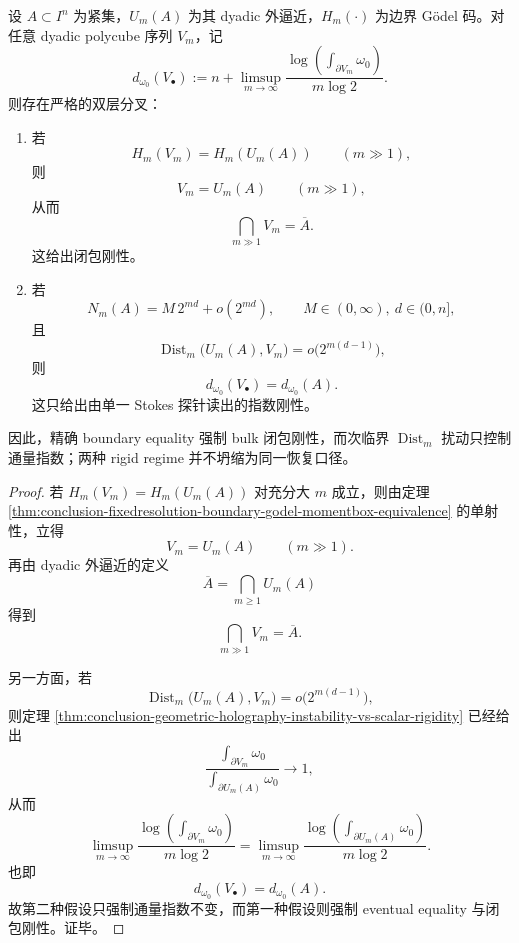 \begin{theorem}\label{thm:conclusion-boundary-godel-holography-closure-vs-exponent-bifurcation}
设 \(A\subset I^n\) 为紧集，\(U_m(A)\) 为其 dyadic 外逼近，\(H_m(\cdot)\) 为边界 Gödel 码。对任意 dyadic polycube 序列 \(V_m\)，记
\[
d_{\omega_0}(V_\bullet)
:=
n+\limsup_{m\to\infty}
\frac{\log\!\left(\int_{\partial V_m}\omega_0\right)}{m\log 2}.
\]
则存在严格的双层分叉：
\begin{enumerate}
  \item 若
  \[
  H_m(V_m)=H_m(U_m(A))
  \qquad (m\gg 1),
  \]
  则
  \[
  V_m=U_m(A)
  \qquad (m\gg 1),
  \]
  从而
  \[
  \bigcap_{m\gg 1}V_m=\overline A.
  \]
  这给出闭包刚性。
  \item 若
  \[
  N_m(A)=M\,2^{md}+o(2^{md}),
  \qquad
  M\in(0,\infty),\ d\in(0,n],
  \]
  且
  \[
  \operatorname{Dist}_m\bigl(U_m(A),V_m\bigr)=o\!\bigl(2^{m(d-1)}\bigr),
  \]
  则
  \[
  d_{\omega_0}(V_\bullet)=d_{\omega_0}(A).
  \]
  这只给出由单一 Stokes 探针读出的指数刚性。
\end{enumerate}
因此，精确 boundary equality 强制 bulk 闭包刚性，而次临界 \(\operatorname{Dist}_m\) 扰动只控制通量指数；两种 rigid regime 并不坍缩为同一恢复口径。
\end{theorem}
\begin{proof}
若 \(H_m(V_m)=H_m(U_m(A))\) 对充分大 \(m\) 成立，则由定理 \ref{thm:conclusion-fixedresolution-boundary-godel-momentbox-equivalence} 的单射性，立得
\[
V_m=U_m(A)
\qquad (m\gg 1).
\]
再由 dyadic 外逼近的定义
\[
\overline A=\bigcap_{m\ge 1}U_m(A)
\]
得到
\[
\bigcap_{m\gg 1}V_m=\overline A.
\]

另一方面，若
\[
\operatorname{Dist}_m\bigl(U_m(A),V_m\bigr)=o\!\bigl(2^{m(d-1)}\bigr),
\]
则定理 \ref{thm:conclusion-geometric-holography-instability-vs-scalar-rigidity} 已经给出
\[
\frac{\int_{\partial V_m}\omega_0}{\int_{\partial U_m(A)}\omega_0}\to 1,
\]
从而
\[
\limsup_{m\to\infty}
\frac{\log\!\left(\int_{\partial V_m}\omega_0\right)}{m\log 2}
=
\limsup_{m\to\infty}
\frac{\log\!\left(\int_{\partial U_m(A)}\omega_0\right)}{m\log 2}.
\]
也即
\[
d_{\omega_0}(V_\bullet)=d_{\omega_0}(A).
\]
故第二种假设只强制通量指数不变，而第一种假设则强制 eventual equality 与闭包刚性。证毕。
\end{proof}

